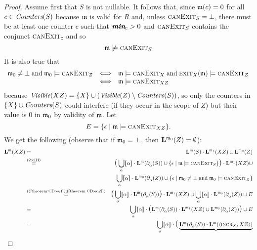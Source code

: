 \begin{proof}
  Assume first that $S$ is not nullable.
  It follows that,
  since $\mem(c)=0$ for all $c\in\COUNTERS{S}$ because $\mem$ is valid for $R$
  and, unless $\CanExit{S}=\bot$, there must be at least one
  counter c such that $\MIN{c}>0$ and $\CanExit{S}$ contains the conjunct
  $\CanExit{c}$ and so
  \begin{equation}
    \label{theorem:CD:eq1}
  \mem\not\models\CanExit{S}
  \end{equation}
It is also true that
  \begin{equation}
    \begin{array}{rcl}
    \label{theorem:CD:eq2}
    \mem_0\neq\bot \;\textrm{and}\;
    \mem_0\models \CanExit{Z} &\Iff& 
    \mem\models\CanExit{X} \;\textrm{and}\;
    \ExitOp[X](\mem) \models \CanExit{Z}  \\
    &\Iff&
    \mem\models\CanExit{XZ}
   \end{array}
  \end{equation}
  because $\VISIBLE{XZ}=\{X\}\cup(\VISIBLE{Z}\setminus\COUNTERS{S})$, so only the counters in
  $\{X\}\cup\COUNTERS{S}$ could interfere (if they occur in the scope of $Z$) but their value is $0$ in $\mem_0$
  by validity of $\mem$.
  Let $$ E=\{\eps\mid\mem\models\CanExit{XZ}\}.$$
  We get the following (observe that if $\mem_0=\bot$, then $
  \LANG{\mem_0}{Z}=\emptyset$):
\begin{eqnarray*}
  \LANG{\mem}{XZ} &=& \LANG{\mem}{S}\cdot\LANG{\mem_1}{XZ} \cup \LANG{\mem_0}{Z}
  \\
  &\stackrel{(2\times\textrm{IH})}{=}& \LPAR \bigcup_{\alpha}\den{\alpha}\cdot\LANG{\mem}{\CD{\alpha}{S}}
  \cup \{\eps\mid\mem\models\CanExit{S}\}
  \RPAR\cdot \LANG{\mem_1}{XZ}
  \cup \\
  && \bigcup_{\alpha}\den{\alpha}\cdot \LANG{\mem_0}{\CD{\alpha}{Z}}
  \cup \{\eps\mid\mem_0\neq\bot\; \textrm{and}\;\mem_0\models\CanExit{Z}\}\\
  &\stackrel{(\textrm{(\ref{theorem:CD:eq1}),(\ref{theorem:CD:eq2})})}{=}&
  \LPAR \bigcup_{\alpha}\den{\alpha}\cdot\LANG{\mem}{\CD{\alpha}{S}}
  \RPAR\cdot \LANG{\mem_1}{XZ}
  \cup \bigcup_{\alpha}\den{\alpha}\cdot \LANG{\mem_0}{\CD{\alpha}{Z}} \cup E 
  \\
  &=& \bigcup_{\alpha}\den{\alpha}\cdot\LPAR\LANG{\mem}{\CD{\alpha}{S}}\cdot\LANG{\mem_1}{XZ}\cup
  \LANG{\mem_0}{\CD{\alpha}{Z}} \RPAR \cup E \\
  &=& \bigcup_{\alpha}\den{\alpha}\cdot\LPAR
  \underbrace{\LANG{\mem}{\CD{\alpha}{S}}\cdot\LANG{\mem}{\pair{\IncrOp[X]}{XZ}}}_{
      \begin{array}{@{}c@{}}

\end{array}}
\end{eqnarray*}
\end{proof}

